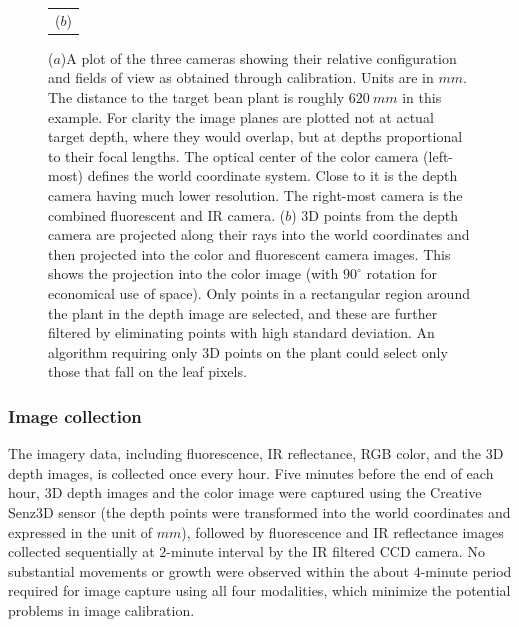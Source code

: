 \begin{figure}
\begin{tabular}{c}
  ($b$)\\
\end{tabular}
\caption{($a$)A plot of the three cameras showing their relative configuration and fields of view as obtained through calibration.  Units are in $mm$. The distance to the target bean plant is roughly $620~mm$ in this example. For clarity the image planes are plotted not at actual target depth, where they would overlap, but at depths proportional to their focal lengths. The optical center of the color camera (left-most) defines the world coordinate system.  Close to it is the depth camera having much lower resolution.  The right-most camera is the combined fluorescent and IR camera. ($b$) $3$D points from the depth camera are projected along their rays into the world coordinates and then projected into the color and fluorescent camera images.  This shows the projection into the color image (with $90^{\circ}$ rotation for economical use of space).  Only points in a rectangular region around the plant in the depth image are selected, and these are further filtered by eliminating points with high standard deviation.  An algorithm requiring only $3$D points on the plant could select only those that fall on the leaf pixels.}
\label{fig:CameraConfiguration}
\end{figure}


\subsubsection{Image collection}
The imagery data, including fluorescence, IR reflectance,  RGB color, and the $3$D depth images, is collected once every hour.
Five minutes before the end of each hour, $3$D depth images and the color image were captured using the Creative Senz3D sensor (the depth points were transformed into the world coordinates and expressed in the unit of $mm$), followed by fluorescence and IR reflectance images collected sequentially at $2$-minute interval by the IR filtered CCD camera.
No substantial movements or growth were observed within the about $4$-minute period required for image capture using all four modalities, which minimize the potential problems in image calibration.

%

